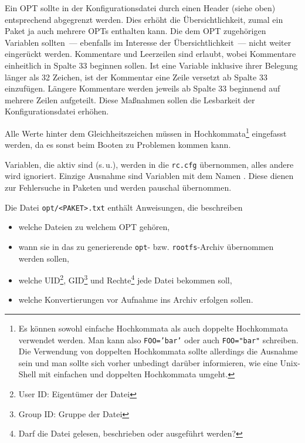 Ein OPT sollte in der Konfigurationsdatei durch einen Header (siehe
oben) entsprechend abgegrenzt werden. Dies erhöht die Übersichtlichkeit,
zumal ein Paket ja auch mehrere OPTs enthalten kann. Die dem OPT
zugehörigen Variablen sollten~--- ebenfalls im Interesse der
Übersichtlichkeit~--- nicht weiter eingerückt werden. Kommentare und
Leerzeilen sind erlaubt, wobei Kommentare einheitlich in Spalte 33
beginnen sollen. Ist eine Variable inklusive ihrer Belegung länger als
32 Zeichen, ist der Kommentar eine Zeile versetzt ab Spalte 33 einzufügen.
Längere Kommentare werden jeweils ab Spalte 33 beginnend auf mehrere Zeilen
aufgeteilt. Diese Maßnahmen sollen die Lesbarkeit der Konfigurationsdatei
erhöhen.

Alle Werte hinter
dem Gleichheitszeichen müssen in Hochkommata\footnote{Es können sowohl
einfache Hochkommata als auch doppelte Hochkommata verwendet werden.
Man kann also \texttt{FOO='bar'} oder auch \texttt{FOO="bar"}
schreiben.  Die Verwendung von doppelten Hochkommata sollte
allerdings die Ausnahme sein und man sollte sich vorher
unbedingt darüber informieren, wie eine Unix-Shell mit einfachen und
doppelten Hochkommata umgeht.} eingefasst werden, da es sonst beim
Booten zu Problemen kommen kann.

    Variablen, die aktiv sind (s.\,u.), werden in die \texttt{rc.cfg} übernommen,
    alles andere wird ignoriert. Einzige Ausnahme sind Variablen mit
    dem Namen . Diese dienen zur Fehlersuche in
    Paketen und werden pauschal übernommen.


    Die Datei \texttt{opt/<PAKET>.txt} enthält Anweisungen, die beschreiben
\begin{itemize}
\item welche Dateien zu welchem OPT gehören,
\item wann sie in das zu generierende \texttt{opt}- bzw. \texttt{rootfs}-Archiv
    übernommen werden sollen,
\item welche UID\footnote{User ID: Eigentümer der Datei}, GID\footnote{Group ID:
Gruppe der Datei} und Rechte\footnote{Darf die Datei gelesen,
beschrieben oder ausgeführt werden?} jede Datei bekommen soll,
\item welche Konvertierungen vor Aufnahme ins Archiv erfolgen sollen.
\end{itemize}

